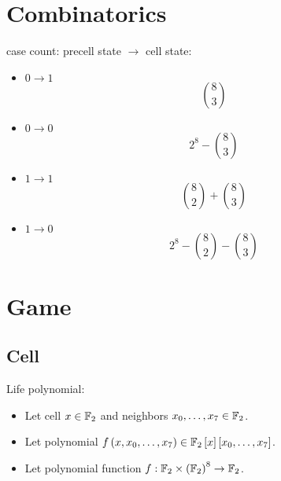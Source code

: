 \documentclass[letterpaper, 14pt]{extarticle}
\begin{document}

\begin{center}
\Large{\mytitle}
\end{center}

\tableofcontents

\begin{flushleft}


\section{Combinatorics}

\begin{remark}
case count: precell state $\to$ cell state:
\begin{itemize}
\item $0 \to 1$ $$\binom{8}{3}$$
\item $0 \to 0$ $$2^8 - \binom{8}{3}$$
\item $1 \to 1$ $$\binom{8}{2} + \binom{8}{3}$$
\item $1 \to 0$ $$2^8 - \binom{8}{2} - \binom{8}{3}$$
\end{itemize}
\end{remark}


\section{Game}


\subsection{Cell}

\begin{definition}
Life polynomial:
\begin{itemize}
\item Let cell $x \in \mathbb{F}_2$ and
  neighbors $x_{0}, \ldots, x_{7} \in \mathbb{F}_2$.
\item Let polynomial $f \left( x, x_{0}, \ldots, x_{7} \right) \in \mathbb{F}_2 \left[ x \right] \left[ x_{0}, \ldots, x_{7} \right]$.
\item Let polynomial function
  $f: \mathbb{F}_2 \times {\left( \mathbb{F}_2\right)}^8 \to \mathbb{F}_2$.
\end{itemize}
\end{definition}


\end{flushleft}
\end{document}
